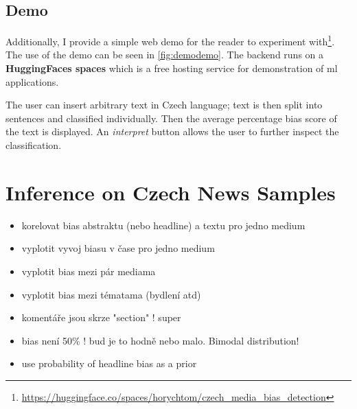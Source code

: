 \subsection{Demo}
Additionally, I provide a simple web demo for the reader to experiment with\footnote{\url{https://huggingface.co/spaces/horychtom/czech_media_bias_detection}}. The use of the demo can be seen in \ref{fig:demodemo}. The backend runs on a \textbf{HuggingFaces spaces} which is a free hosting service for demonstration of \gls{ml} applications. 

The user can insert arbitrary text in Czech language; text is then split into sentences and classified individually. Then the average percentage bias score of the text is displayed. An \textit{interpret} button allows the user to further inspect the classification.


  

\section{Inference on Czech News Samples}\label{inference}

\begin{itemize}
    \item korelovat bias abstraktu (nebo headline) a textu pro jedno medium
    \item vyplotit vyvoj biasu v čase pro jedno medium
    \item vyplotit bias mezi pár mediama
    \item vyplotit bias mezi tématama (bydlení atd)
    \item komentáře jsou skrze "section" ! super
    \item bias není 50\% ! bud je to hodně nebo malo. Bimodal distribution!
    \item use probability of headline bias as a prior
\end{itemize}
